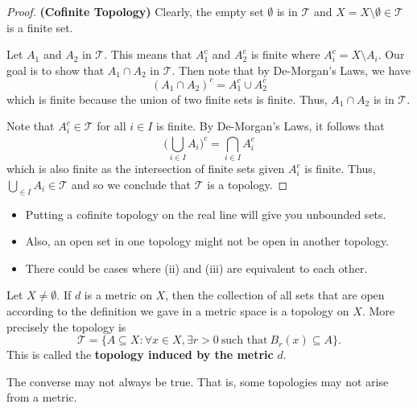 \begin{proof} \textbf{(Cofinite Topology)}
Clearly, the empty set \( \emptyset  \) is in \( \mathcal{T} \) and \( X = X \setminus \emptyset \in \mathcal{T}  \) is a finite set. 

Let \( {A}_{1} \) and \( {A}_{2} \) in \( \mathcal{T} \). This means that \( {A}_{1}^{c} \) and \( {A}_{2}^{c} \) is finite where \( {A}_{i}^{c} = X \setminus  {A}_{i}  \). Our goal is to show that \( {A}_{1} \cap {A}_{2} \) in \( \mathcal{T} \). Then note that by De-Morgan's Laws, we have   
\[  ({A}_{1} \cap {A}_{2})^{c} = {A}_{1}^{c} \cup {A}_{2}^{c} \]
which is finite because the union of two finite sets is finite. Thus, \( {A}_{1} \cap {A}_{2}  \) is in \( \mathcal{T} \).

Note that \( {A}_{i}^{c} \in \mathcal{T} \) for all \( i \in I \) is finite. By De-Morgan's Laws, it follows that 
\[  \Big( \bigcup_{ i \in I  }^{  }  {A}_{i} \Big)^{c} = \bigcap_{ i \in I  }^{  }  {A}_{i}^{c} \]
which is also finite as the intersection of finite sets given \( {A}_{i}^{c} \) is finite. Thus, \( \bigcup_{  \in I  }^{   }  {A}_{i} \in \mathcal{T} \) and so we conclude that \( \mathcal{T} \) is a topology.
\end{proof}

\begin{remark}
    \begin{itemize}
        \item Putting a cofinite topology on the real line will give you unbounded sets.
        \item Also, an open set in one topology might not be open in another topology.
        \item There could be cases where (ii) and (iii) are equivalent to each other.
    \end{itemize}

\end{remark}

\begin{eg}
    Let \( X \neq \emptyset  \). If \( d  \) is a metric on \( X  \), then the collection of all sets that are open according to the definition we gave in a metric space is a topology on \( X  \). More precisely the topology is
    \[  \mathcal{T} = \{  A \subseteq X : \forall x \in X , \exists r > 0 \ \text{such that} \ {B}_{r}(x) \subseteq A \}.  \]
    This is called the \textbf{topology induced by the metric} \( d \).
\end{eg}

\begin{remark}
    The converse may not always be true. That is, some topologies may not arise from a metric.
\end{remark}

